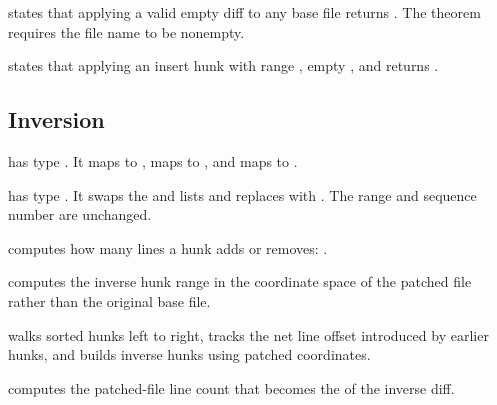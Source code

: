 \begin{theorem}
 states that applying a valid empty diff to any base
file returns . The theorem requires the file name to be
nonempty.
\end{theorem}

\begin{theorem}
 states that applying an insert hunk with
range , empty , and
 returns .
\end{theorem}

\subsection{Inversion}

\begin{definition}[invertOp]
\code{[invertOp]} has type . It maps  to
, maps  to , and maps  to
.
\end{definition}

\begin{definition}[invertHunk]
\code{[invertHunk]} has type . It swaps the 
and  lists and replaces  with . The
range and sequence number are unchanged.
\end{definition}

\begin{definition}[hunkLineDelta]
\code{[hunkLineDelta]} computes how many lines a hunk adds or removes:
.
\end{definition}

\begin{definition}[inverseRangeOnPatched]
\code{[inverseRangeOnPatched]} computes the inverse hunk range in the
coordinate space of the patched file rather than the original base file.
\end{definition}

\begin{definition}[invertOrderedHunks]
\code{[invertOrderedHunks]} walks sorted hunks left to right, tracks the net
line offset introduced by earlier hunks, and builds inverse hunks using patched
coordinates.
\end{definition}

\begin{definition}[resultLineCount]
\code{[resultLineCount]} computes the patched-file line count that becomes the
 of the inverse diff.
\end{definition}

